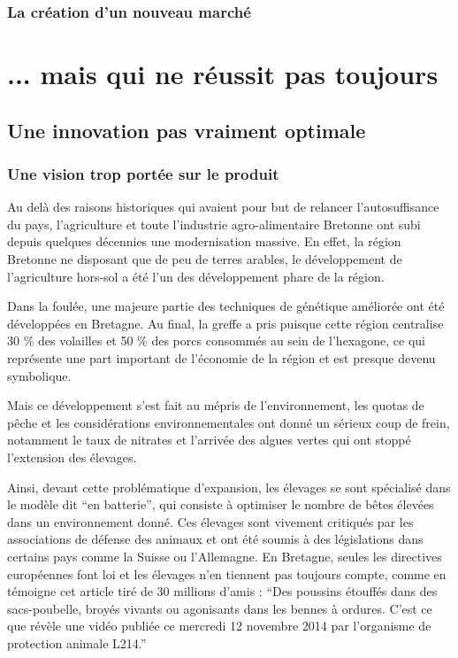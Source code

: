 \documentclass[a4paper,12pt]{report}
\begin{document}
		\subsection{La création d'un nouveau marché}

\chapter{... mais qui ne réussit pas toujours}

	\section{Une innovation pas vraiment optimale}
	
		\subsection{Une vision trop portée sur le produit}
			Au delà des raisons historiques qui avaient pour but de relancer l’autosuffisance du pays, l’agriculture et toute l’industrie agro-alimentaire Bretonne ont subi depuis quelques décennies une modernisation massive. En effet, la région Bretonne ne disposant que de peu de terres arables, le développement de l’agriculture hors-sol a été l’un des développement phare de la région. 
			
			Dans la foulée, une majeure partie des techniques de génétique améliorée ont été développées en Bretagne. Au final, la greffe a pris puisque cette région centralise 30 \% des volailles et 50 \% des porcs consommés au sein de l’hexagone, ce qui représente une part important de l’économie de la région et est presque devenu symbolique.
			
			Mais ce développement s’est fait au mépris de l’environnement, les quotas de pêche et les considérations environnementales ont donné un sérieux coup de frein, notamment le taux de nitrates et l’arrivée des algues vertes qui ont stoppé l’extension des élevages.
			
			Ainsi, devant cette problématique d’expansion, les élevages se sont spécialisé dans le modèle dit “en batterie”, qui consiste à optimiser le nombre de bêtes élevées dans un environnement donné. Ces élevages sont vivement critiqués par les associations de défense des animaux  et ont été soumis à des législations dans certains pays comme la Suisse ou l’Allemagne. En Bretagne, seules les directives européennes font loi et les élevages n’en tiennent pas toujours compte, comme en témoigne cet article tiré de 30 millions d’amis\cite{BretagnePoussinsBroyesEtouffesDansCouvoir} : “Des poussins étouffés dans des sacs-poubelle, broyés vivants ou agonisants dans les bennes à ordures. C'est ce que révèle une vidéo publiée ce mercredi 12 novembre 2014 par l’organisme de protection animale L214.”
			
\end{document}
